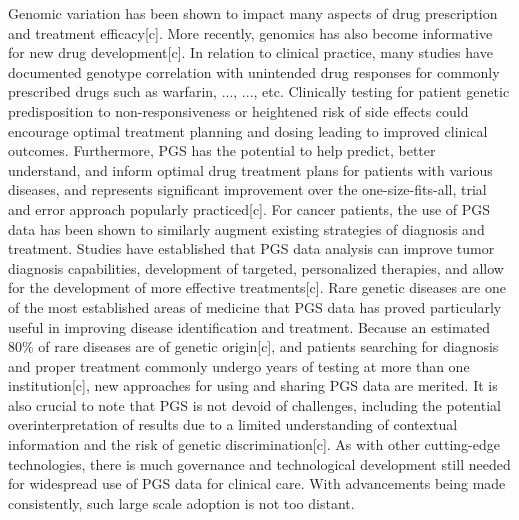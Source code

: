 \documentclass{article}
\begin{document}
Genomic variation has been shown to impact many aspects of drug prescription and treatment efficacy[c]. More recently, genomics has also become informative for new drug development[c]. 
In relation to clinical practice, many studies have documented genotype correlation with unintended drug responses for commonly prescribed drugs such as warfarin, ..., ..., etc. 
Clinically testing for patient genetic predisposition to non-responsiveness or heightened risk of side effects could encourage optimal treatment planning and dosing leading to improved clinical outcomes. 
Furthermore, PGS has the potential to help predict, better understand, and inform optimal drug treatment plans for patients with various diseases, and represents significant improvement over the one-size-fits-all, trial and error approach popularly practiced[c]. 
For cancer patients, the use of PGS data has been shown to similarly augment existing strategies of diagnosis and treatment. Studies have established that PGS data analysis can improve tumor diagnosis capabilities, development of targeted, personalized therapies, and allow for the development of more effective treatments[c]. 
Rare genetic diseases are one of the most established areas of medicine that PGS data has proved particularly useful in improving disease identification and treatment. 
Because an estimated 80\% of rare diseases are of genetic origin[c], and patients searching for diagnosis and proper treatment commonly undergo years of testing at more than one institution[c], new approaches for using and sharing PGS data are merited. 
It is also crucial to note that PGS is not devoid of challenges, including the potential overinterpretation of results due to a limited understanding of contextual information and the risk of genetic discrimination[c]. 
As with other cutting-edge technologies, there is much governance and technological development still needed for widespread use of PGS data for clinical care. 
With advancements being made consistently, such large scale adoption is not too distant.
\end{document}
